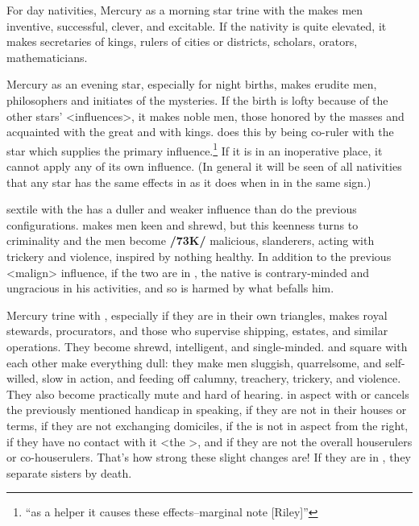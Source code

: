For day nativities, Mercury \marginnote{\Mercury \Trine \Moon} as a morning star trine with the \Moon\xspace makes men inventive, successful, clever, and excitable. If the nativity is quite elevated, it makes secretaries of kings, rulers of cities or districts, scholars, orators, mathematicians.

Mercury as an evening star, especially for night births, makes erudite men, philosophers and initiates of the mysteries. If the birth is lofty because of the other stars’ <influences>, it makes noble men, those honored by the masses and acquainted with the great and with kings. \Mercury\xspace does this by being co-ruler with the star which supplies the primary influence.\footnote{``as a helper it causes these effects--marginal note [Riley]''}
If it is in an inoperative place, it cannot apply any of its own influence. (\mndl In general it will be seen of all nativities that any star has the same effects in \Trine\xspace as it does when in \Conjunction\xspace in the same sign.)

\Mercury\xspace sextile with the \Moon\xspace has a duller and weaker influence than do the previous configurations. \Mercury\xspace \Square\xspace makes men keen and shrewd, but this keenness turns to criminality and the men become \textbf{/73K/} malicious, slanderers, acting with trickery and violence, inspired by nothing healthy. In addition to the previous <malign> influence, if the two are in \Opposition, the native is contrary-minded and ungracious in his activities, and so is harmed by what befalls him.

Mercury \marginnote{\Mercury \Trine \Saturn} trine with \Saturn, especially if they are in their own triangles, makes royal stewards, procurators, and those who supervise shipping, estates, and similar operations. They become shrewd,
intelligent, and single-minded. \Mercury\xspace and \Saturn\xspace square with each other make everything dull: they make men sluggish, quarrelsome, and self-willed, slow in action, and feeding off calumny, treachery, trickery, and violence. They also become practically mute and hard of hearing. \Mars\xspace in aspect with \Saturn\xspace
or \Mercury\xspace cancels the previously mentioned handicap in speaking, if they are not in their houses or terms,
if they are not exchanging domiciles, if the \Moon\xspace is not in aspect from the right, if they have no contact with it <the \Moon>, and if they are not the overall houserulers or co-houserulers. \mndl That’s how strong these slight changes are! If they are in \Opposition, they separate sisters by death.

